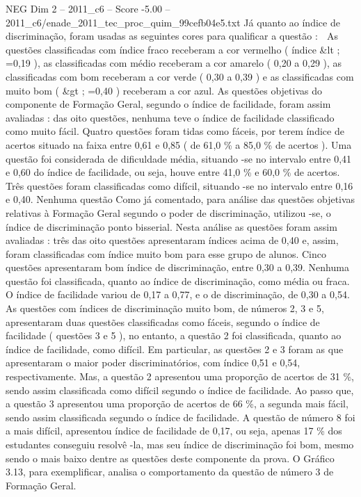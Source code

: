 \begin{textsample}{NEG Dim 2 – 2011\_c6 – Score -5.00 – 2011\_c6/enade\_2011\_tec\_proc\_quim\_99cefb04e5.txt}
Já quanto ao índice de discriminação, foram usadas as seguintes cores para qualificar a questão :  As questões classificadas com índice fraco receberam a cor vermelho ( índice \&lt ; =0,19 ), as classificadas com médio receberam a cor amarelo ( 0,20 a 0,29 ), as classificadas com bom receberam a cor verde ( 0,30 a 0,39 ) e as classificadas com muito bom ( \&gt ; =0,40 ) receberam a cor azul.
As questões objetivas do componente de Formação Geral, segundo o índice de facilidade, foram assim avaliadas : das oito questões, nenhuma teve o índice de facilidade classificado como muito fácil.
Quatro questões foram tidas como fáceis, por terem índice de acertos situado na faixa entre 0,61 e 0,85 ( de 61,0 \% a 85,0 \% de acertos ).
Uma questão foi considerada de dificuldade média, situando -se no intervalo entre 0,41 e 0,60 do índice de facilidade, ou seja, houve entre 41,0 \% e 60,0 \% de acertos.
Três questões foram classificadas como difícil, situando -se no intervalo entre 0,16 e 0,40.
Nenhuma questão Como já comentado, para análise das questões objetivas relativas à Formação Geral segundo o poder de discriminação, utilizou -se, o índice de discriminação ponto bisserial.
Nesta análise as questões foram assim avaliadas : três das oito questões apresentaram índices acima de 0,40 e, assim, foram classificadas com índice muito bom para esse grupo de alunos.
Cinco questões apresentaram bom índice de discriminação, entre 0,30 a 0,39.
Nenhuma questão foi classificada, quanto ao índice de discriminação, como média ou fraca.
O índice de facilidade variou de 0,17 a 0,77, e o de discriminação, de 0,30 a 0,54.
As questões com índices de discriminação muito bom, de números 2, 3 e 5, apresentaram duas questões classificadas como fáceis, segundo o índice de facilidade ( questões 3 e 5 ), no entanto, a questão 2 foi classificada, quanto ao índice de facilidade, como difícil.
Em particular, as questões 2 e 3 foram as que apresentaram o maior poder discriminatórios, com índice 0,51 e 0,54, respectivamente.
Mas, a questão 2 apresentou uma proporção de acertos de 31 \%, sendo assim classificada como difícil segundo o índice de facilidade.
Ao passo que, a questão 3 apresentou uma proporção de acertos de 66 \%, a segunda mais fácil, sendo assim classificada segundo o índice de facilidade.
A questão de número 8 foi a mais difícil, apresentou índice de facilidade de 0,17, ou seja, apenas 17 \% dos estudantes conseguiu resolvê -la, mas seu índice de discriminação foi bom, mesmo sendo o mais baixo dentre as questões deste componente da prova.
O Gráfico 3.13, para exemplificar, analisa o comportamento da questão de número 3 de Formação Geral.

\end{textsample}
